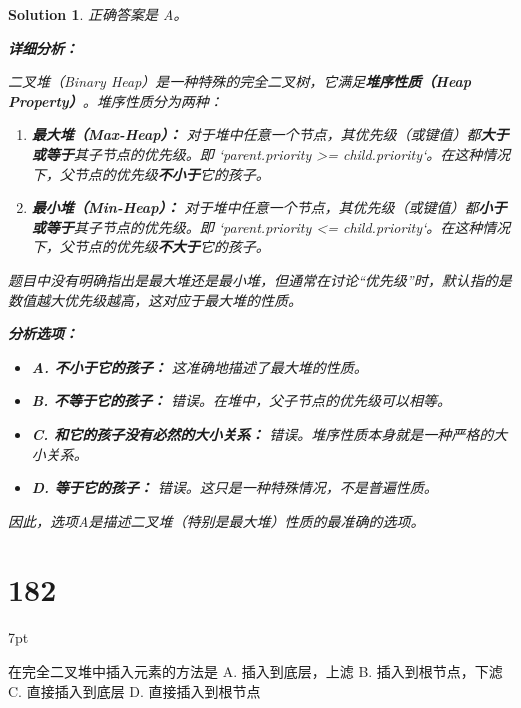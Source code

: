 \documentclass[UTF8]{report}
\newtheorem{solution}{Solution}
\theoremstyle{MyLineTheoremStyle} %
\theoremstyle{MyBlockTheoremStyle} %
\theoremstyle{MySubsubsectionStyle} %
\newenvironment{graybox}{%
        \def\FrameCommand{%
        \hspace{1pt}%
        {\color{gray}\small \vrule width 2pt}%
        {\color{graybox_color}\vrule width 4pt}%
        \colorbox{graybox_color}%
        }%
        \MakeFramed{\advance\hsize-\width\FrameRestore}%
        \noindent\hspace{-4.55pt}%
        \begin{adjustwidth}{}{7pt}%
        \vspace{2pt}\vspace{2pt}%
        }
        {%
        \vspace{2pt}\end{adjustwidth}\endMakeFramed%
        }
\begin{document}
\begin{solution}
正确答案是 A。

\textbf{详细分析：}

二叉堆（Binary Heap）是一种特殊的完全二叉树，它满足\textbf{堆序性质（Heap Property）}。堆序性质分为两种：

\begin{enumerate}
    \item \textbf{最大堆（Max-Heap）：}
    对于堆中任意一个节点，其优先级（或键值）都\textbf{大于或等于}其子节点的优先级。即 `parent.priority >= child.priority`。在这种情况下，父节点的优先级\textbf{不小于}它的孩子。

    \item \textbf{最小堆（Min-Heap）：}
    对于堆中任意一个节点，其优先级（或键值）都\textbf{小于或等于}其子节点的优先级。即 `parent.priority <= child.priority`。在这种情况下，父节点的优先级\textbf{不大于}它的孩子。
\end{enumerate}

题目中没有明确指出是最大堆还是最小堆，但通常在讨论“优先级”时，默认指的是数值越大优先级越高，这对应于最大堆的性质。

\textbf{分析选项：}
\begin{itemize}
    \item \textbf{A. 不小于它的孩子：} 这准确地描述了最大堆的性质。
    \item \textbf{B. 不等于它的孩子：} 错误。在堆中，父子节点的优先级可以相等。
    \item \textbf{C. 和它的孩子没有必然的大小关系：} 错误。堆序性质本身就是一种严格的大小关系。
    \item \textbf{D. 等于它的孩子：} 错误。这只是一种特殊情况，不是普遍性质。
\end{itemize}

因此，选项A是描述二叉堆（特别是最大堆）性质的最准确的选项。
\end{solution}

\section*{182}
\begin{graybox}
在完全二叉堆中插入元素的方法是
A. 插入到底层，上滤
B. 插入到根节点，下滤
C. 直接插入到底层
D. 直接插入到根节点
\end{graybox}
\end{document}
